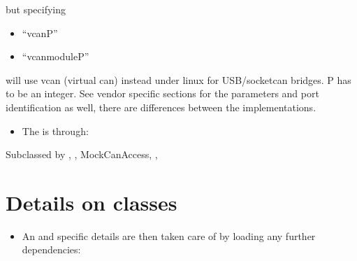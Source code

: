 \documentclass[a4paper,10pt,english]{sphinxmanual}
\begin{document}
\sphinxAtStartPar
but specifying
\begin{itemize}
\item {} 
\sphinxAtStartPar
“vcanP”

\item {} 
\sphinxAtStartPar
“vcanmoduleP”

\end{itemize}

\sphinxAtStartPar
will use vcan (virtual can) instead under linux for USB/socketcan bridges. P has to be an integer.
See vendor specific sections for the parameters and port identification as well, there are differences between
the implementations.
\begin{itemize}
\item {} 
\sphinxAtStartPar
The  is through:

\end{itemize}

\begin{fulllineitems}
%
\pysigstartmultiline
{}%
\pysigstopmultiline
\sphinxAtStartPar
Subclassed by {\hyperref[\detokenize{classestracing:classAnaCanScan}]{}}, {\hyperref[\detokenize{vendors/systec:classCSockCanScan}]{}}, MockCanAccess, {\hyperref[\detokenize{vendors/peak:classPKCanScan}]{}}, {\hyperref[\detokenize{classestracing:classSTCanScan}]{}}

\end{fulllineitems}



\chapter{Details on classes}
\label{\detokenize{classestracing:details-on-classes}}\label{\detokenize{classestracing::doc}}\begin{itemize}
\item {} 
\sphinxAtStartPar
An  and specific details are then taken care of by loading any further dependencies:

\end{itemize}
\end{document}
